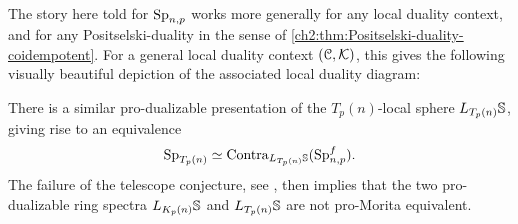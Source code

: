 \begin{remark}
    The story here told for $\Sp\np$ works more generally for any local duality context, and for any Positselski-duality in the sense of \cref{ch2:thm:Positselski-duality-coidempotent}. For a general local duality context $(\C, \K)$, this gives the following visually beautiful depiction of the associated local duality diagram:
    \begin{center}
    \end{center}
\end{remark}

\begin{remark}
    There is a similar pro-dualizable presentation of the $T_p(n)$-local sphere $L_{T_p(n)}\S$, giving rise to an equivalence
    \[\Sp_{T_p(n)}\simeq \Contra_{L_{T_p(n)}\S}(\Sp\np^f).\]
    The failure of the telescope conjecture, see \cite{burklund-hahn-levy-schlank_23}, then implies that the two pro-dualizable ring spectra $L_{K_p(n)}\S$ and $L_{T_p(n)}\S$ are not pro-Morita equivalent.  
\end{remark}

